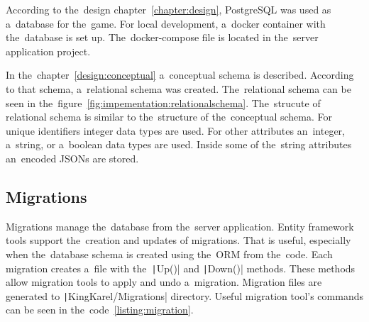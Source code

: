 According to the~design chapter~\ref{chapter:design}, PostgreSQL was used as a~database for the~game.
For local development, a~docker container with the~database is set up.
The~docker-compose file is located in the~server application project.

In the~chapter~\ref{design:conceptual} a~conceptual schema is described.
According to that schema, a~relational schema was created.
The~relational schema can be seen in the~figure~\ref{fig:impementation:relationalschema}.
The~strucute of relational schema is similar to the~structure of the~conceptual schema.
For unique identifiers integer data types are used.
For other attributes an~integer, a~string, or a~boolean data types are used.
Inside some of the~string attributes an~encoded JSONs are stored.

\subsection{Migrations}

Migrations manage the~database from the~server application.
Entity framework tools support the~creation and updates of migrations.
That is useful, especially when the~database schema is created using the~ORM from the~code.
Each migration creates a~file with the~\texttt|Up()| and \texttt|Down()| methods.
These methods allow migration tools to apply and undo a~migration.
Migration files are generated to \texttt|KingKarel/Migrations| directory.
Useful migration tool's commands can be seen in the~code~\ref{listing:migration}.
